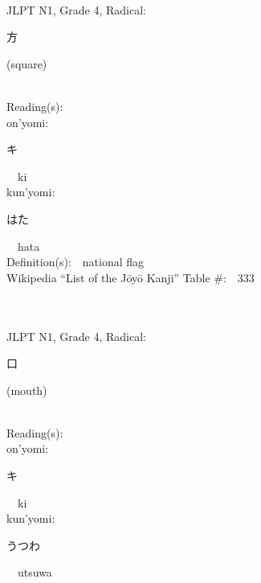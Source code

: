 \begin{multicols}{2}
{\fontsize{34pt}{40pt}  }\ \ \\  %
{JLPT N1, Grade 4, Radical:\ \ {\begin{CJK}{UTF8}{min} 方 \end{CJK}} (square) } \\
Reading(s):\ \ \\
{\hspace*{1em}}on'yomi:\ \ \\
{\hspace*{2em}}{\begin{CJK}{UTF8}{min} キ \end{CJK}}\ \ ki\ \ \\
{\hspace*{1em}}kun'yomi:\ \ \\
{\hspace*{2em}}{\begin{CJK}{UTF8}{min} はた \end{CJK}}\ \ hata\ \ \\
Definition(s):\ \ national flag \\
Wikipedia ``List of the J\=oy\=o Kanji'' Table \#:\ \ 333 \\
\ \ \\
{\fontsize{34pt}{40pt}  }\ \ \\  %
{JLPT N1, Grade 4, Radical:\ \ {\begin{CJK}{UTF8}{min} 口 \end{CJK}} (mouth) } \\
Reading(s):\ \ \\
{\hspace*{1em}}on'yomi:\ \ \\
{\hspace*{2em}}{\begin{CJK}{UTF8}{min} キ \end{CJK}}\ \ ki\ \ \\
{\hspace*{1em}}kun'yomi:\ \ \\
{\hspace*{2em}}{\begin{CJK}{UTF8}{min} うつわ \end{CJK}}\ \ utsuwa\ \ \\

\end{multicols}
